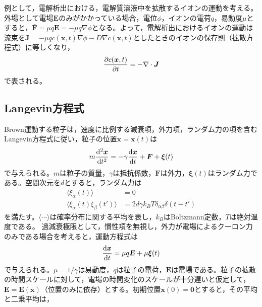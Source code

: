 \documentclass[autodetect-engine,dvi=dvipdfmx,a4paper,ja=standard,oneside,openany,11pt]{bxjsbook}
\begin{document}
例として，電解析出における，電解質溶液中を拡散するイオンの運動を考える。外場として電場$\bm{E}$のみがかかっている場合，電位$\phi$，イオンの電荷$q$，易動度$\mu$とすると，$\bm{\bar{F}}=\mu q\bm{E}=-\mu q \nabla\phi$となる。よって，電解析出におけるイオンの運動は流束を$\bm{J}=-\mu qc(\bm{x},t) \nabla\phi-D\nabla c(\bm{x},t)$としたときのイオンの保存則（拡散方程式）に等しくなり，
\begin{equation}
  \pdv{c(\bm{x},t)}{t}=-\nabla\cdot\bm{J}
  \label{eq:RW_diffusion_result_divergence_ion}
\end{equation}
で表される。
\subsection{Langevin方程式}
\label{sec:Langevin}
Brown運動する粒子は，速度に比例する減衰項，外力項，ランダム力の項を含むLangevin方程式に従い，粒子の位置$\bm{x}=\bm{x}(t)$は
\begin{equation}
  m\odv[2]{\bm{x}}{t}=-\gamma\odv{\bm{x}}{t}+\bm{F}+\bm{\xi}(t)
  \label{eq:Langevin}
\end{equation}
で与えられる。$m$は粒子の質量，$\gamma$は抵抗係数，$\bm{F}$は外力，$\bm{\xi}(t)$はランダム力である。空間次元を$d$とすると，ランダム力は
\begin{equation}
  \begin{split}
    \langle\xi_\alpha(t)\rangle              & =0                                              \\
    \langle\xi_\alpha(t)\xi_\beta(t')\rangle & =2d\gamma k_B T\delta_{\alpha\beta}\delta(t-t')
  \end{split}
  \label{eq:random_force}
\end{equation}
を満たす。$\langle\cdots\rangle$は確率分布に関する平均を表し，$k_B$はBoltzmann定数，$T$は絶対温度である。
過減衰極限として，慣性項を無視し，外力が電場によるクーロン力のみである場合を考えると，運動方程式は
\begin{equation}
  \odv{\bm{x}}{t}=\mu q\bm{E}+\mu\bm{\xi}(t)
  \label{eq:Langevin_overdamped}
\end{equation}
で与えられる。$\mu=1/\gamma$は易動度，$q$は粒子の電荷，$\bm{E}$は電場である。粒子の拡散の時間スケールに対して，電場の時間変化のスケールが十分遅いと仮定して，$\bm{E}=\bm{E}(\bm{x})$（位置のみに依存）とする。初期位置$\bm{x}(0)=\bm{0}$とすると，その平均と二乗平均は，
\end{document}
